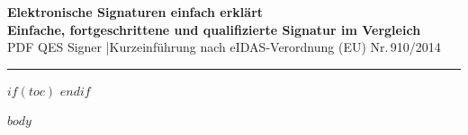 \documentclass[a4paper,10pt]{article}
\begin{document}
\thispagestyle{fancy}

\begin{center}
  {\LARGE\bfseries\color{qesblue}
    Elektronische Signaturen einfach erklärt}\\[0.5cm]
  {\large\bfseries Einfache, fortgeschrittene und qualifizierte Signatur im Vergleich}\\[0.3cm]
  {\small\color{gray}
    PDF QES Signer \enspace|\enspace Kurzeinführung nach eIDAS-Verordnung (EU) Nr.\,910/2014}
\end{center}
{\color{qesblue}\rule{\linewidth}{2pt}}
\vspace{0.6cm}

$if(toc)$
{
\hypersetup{linkcolor=qesblue}
\setcounter{tocdepth}{$toc-depth$}
\tableofcontents
\clearpage
}
$endif$

$body$
\end{document}

